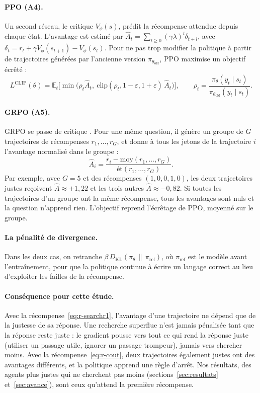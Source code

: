 \paragraph{PPO (A4).} Un second réseau, le critique $V_\phi(s)$, prédit la récompense attendue depuis chaque état. L'avantage est estimé par $\hat{A}_t = \sum_{l \ge 0} (\gamma\lambda)^l \delta_{t+l}$, avec $\delta_t = r_t + \gamma V_\phi(s_{t+1}) - V_\phi(s_t)$. Pour ne pas trop modifier la politique à partir de trajectoires générées par l'ancienne version $\pi_{\theta_\text{old}}$, PPO maximise un objectif écrêté \citep{schulman2017proximal} :
\begin{equation}
L^{\text{CLIP}}(\theta) = \mathbb{E}_t\Big[\min\big(\rho_t \hat{A}_t,\ \mathrm{clip}(\rho_t, 1-\varepsilon, 1+\varepsilon)\,\hat{A}_t\big)\Big], \qquad \rho_t = \frac{\pi_\theta(y_t \mid s_t)}{\pi_{\theta_\text{old}}(y_t \mid s_t)}.
\end{equation}

\paragraph{GRPO (A5).} GRPO se passe de critique \citep{shao2024deepseekmath}. Pour une même question, il génère un groupe de $G$ trajectoires de récompenses $r_1, \dots, r_G$, et donne à tous les jetons de la trajectoire $i$ l'avantage normalisé dans le groupe :
\begin{equation}
\hat{A}_i = \frac{r_i - \mathrm{moy}(r_1, \dots, r_G)}{\mathrm{ét}(r_1, \dots, r_G)}.
\end{equation}
Par exemple, avec $G = 5$ et des récompenses $(1, 0, 0, 1, 0)$, les deux trajectoires justes reçoivent $\hat{A} \approx +1{,}22$ et les trois autres $\hat{A} \approx -0{,}82$. Si toutes les trajectoires d'un groupe ont la même récompense, tous les avantages sont nuls et la question n'apprend rien. L'objectif reprend l'écrêtage de PPO, moyenné sur le groupe.

\paragraph{La pénalité de divergence.} Dans les deux cas, on retranche $\beta\, D_{\mathrm{KL}}(\pi_\theta \,\|\, \pi_\text{ref})$, où $\pi_\text{ref}$ est le modèle avant l'entraînement, pour que la politique continue à écrire un langage correct au lieu d'exploiter les failles de la récompense.

\paragraph{Conséquence pour cette étude.} Avec la récompense~\eqref{eq:r-searchr1}, l'avantage d'une trajectoire ne dépend que de la justesse de sa réponse. Une recherche superflue n'est jamais pénalisée tant que la réponse reste juste : le gradient pousse vers tout ce qui rend la réponse juste (utiliser un passage utile, ignorer un passage trompeur), jamais vers chercher moins. Avec la récompense~\eqref{eq:r-cout}, deux trajectoires également justes ont des avantages différents, et la politique apprend une règle d'arrêt. Nos résultats, des agents plus justes qui ne cherchent pas moins (sections~\ref{sec:resultats} et~\ref{sec:avance}), sont ceux qu'attend la première récompense.
